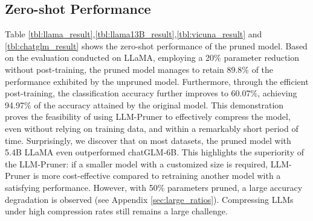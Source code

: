 \documentclass{article}
\begin{document}
\subsection{Zero-shot Performance}

Table \ref{tbl:llama_result},\ref{tbl:llama13B_result},\ref{tbl:vicuna_result} and \ref{tbl:chatglm_result} shows the zero-shot performance of the pruned model. 
Based on the evaluation conducted on LLaMA, employing a 20\% parameter reduction without post-training, the pruned model manages to retain 89.8\% of the performance exhibited by the unpruned model. Furthermore, through the efficient post-training, the classification accuracy further improves to 60.07\%, achieving 94.97\% of the accuracy attained by the original model. This demonstration proves the feasibility of using LLM-Pruner to effectively compress the model, even without relying on training data, and within a remarkably short period of time. 
Surprisingly, we discover that on most datasets, the pruned model with 5.4B LLaMA even outperformed chatGLM-6B. This highlights the superiority of the LLM-Pruner: if a smaller model with a customized size is required, LLM-Pruner is more cost-effective compared to retraining another model with a satisfying performance.
However, with 50\% parameters pruned, a large accuracy degradation is observed (see Appendix \ref{sec:large_ratios}). Compressing LLMs under high compression rates still remains a large challenge.
\end{document}
